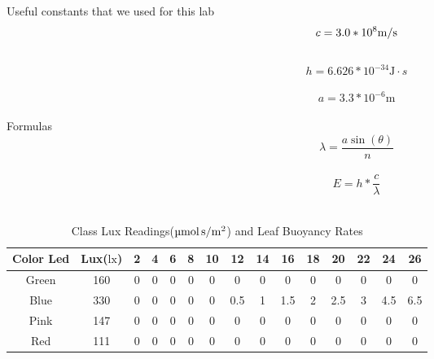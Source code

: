 \documentclass{article}
\begin{document}
    Useful constants that we used for this lab\\
    $$c = 3.0 * 10^{8} \si[per-mode=symbol]{\metre\per\second}$$\\
    $$h = 6.626 * 10^{-34} \si{\joule} \cdot s$$\\
    $$a = 3.3 * 10^{-6} \si{\metre}$$\\
    Formulas\\
    $$\lambda = \dfrac{a \sin(\theta)}{n}$$\\
    $$E = h * \dfrac{c}{\lambda}$$\\
    \begin{longtable}[c]{| c c || c c c c c c c c c c c c c|}
        \caption{Class Lux Readings($\si[per-mode=symbol]{\micro\mol\per\metre\tothe{2}\second}$) and Leaf Buoyancy Rates \label{long}}\\
        \hline
        Color Led & Lux($\si\lux$) & 2  & 4 & 6 & 8 & 10 & 12 & 14 & 16 & 18 & 20 & 22 & 24 & 26\\
        \hline
        Green & 160 & 0 & 0 & 0 & 0 & 0 & 0   & 0 & 0   & 0 & 0   & 0 & 0   & 0 \\
        Blue  & 330 & 0 & 0 & 0 & 0 & 0 & 0.5 & 1 & 1.5 & 2 & 2.5 & 3 & 4.5 & 6.5\\
        Pink  & 147 & 0 & 0 & 0 & 0 & 0 & 0   & 0 & 0   & 0 & 0   & 0 & 0   & 0\\
        Red   & 111 & 0 & 0 & 0 & 0 & 0 & 0   & 0 & 0   & 0 & 0   & 0 & 0   & 0\\
        \hline
    \end{longtable}
\end{document}
